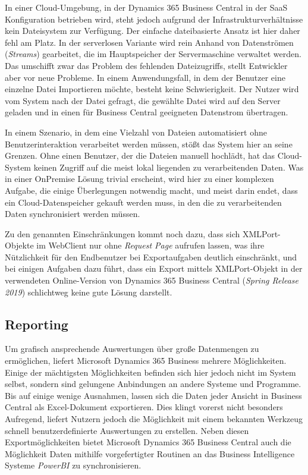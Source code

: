 In einer Cloud-Umgebung, in der Dynamics 365 Business Central in der SaaS Konfiguration betrieben wird, steht jedoch aufgrund der Infrastrukturverhältnisse kein Dateisystem zur Verfügung. Der einfache dateibasierte Ansatz ist hier daher fehl am Platz. In der serverlosen Variante wird rein Anhand von Datenströmen (\textit{Streams}) gearbeitet, die im Hauptspeicher der Servermaschine verwaltet werden. 
Das umschifft zwar das Problem des fehlenden Dateizugriffs, stellt Entwickler aber vor neue Probleme. In einem Anwendungsfall, in dem der Benutzer eine einzelne Datei Importieren möchte, besteht keine Schwierigkeit. Der Nutzer wird vom System nach der Datei gefragt, die gewählte Datei wird auf den Server geladen und in einen für Business Central geeigneten Datenstrom übertragen. \linebreak

In einem Szenario, in dem eine Vielzahl von Dateien automatisiert ohne Benutzerinteraktion verarbeitet werden müssen, stößt das System hier an seine Grenzen. Ohne einen Benutzer, der die Dateien manuell hochlädt, hat das Cloud-System keinen Zugriff auf die meist lokal liegenden zu verarbeitenden Daten. Was in einer OnPremise Lösung trivial erscheint, wird hier zu einer komplexen Aufgabe, die einige Überlegungen notwendig macht, und meist darin endet, dass ein Cloud-Datenspeicher gekauft werden muss, in den die zu verarbeitenden Daten synchronisiert werden müssen. \linebreak

Zu den genannten Einschränkungen kommt noch dazu, dass sich XMLPort-Objekte im WebClient nur ohne \textit{Request Page} aufrufen lassen, was ihre Nützlichkeit für den Endbenutzer bei Exportaufgaben deutlich einschränkt, und bei einigen Aufgaben dazu führt, dass ein Export mittels XMLPort-Objekt in der verwendeten Online-Version von Dynamics 365 Business Central (\textit{Spring Release 2019}) schlichtweg keine gute Lösung darstellt.
\pagebreak

\subsection{Reporting}
Um grafisch ansprechende Auswertungen über große Datenmengen zu ermöglichen, liefert Microsoft Dynamics 365 Business mehrere Möglichkeiten. Einige der mächtigsten Möglichkeiten befinden sich hier jedoch nicht im System selbst, sondern sind gelungene Anbindungen an andere Systeme und Programme. Bis auf einige wenige Ausnahmen, lassen sich die Daten jeder Ansicht in Business Central als Excel-Dokument exportieren. Dies klingt vorerst nicht besonders Aufregend, liefert Nutzern jedoch die Möglichkeit mit einem bekannten Werkzeug schnell benutzerdefinierte Auswertungen zu erstellen. Neben diesen Exportmöglichkeiten bietet Microsoft Dynamics 365 Business Central auch die Möglichkeit Daten mithilfe vorgefertigter Routinen an das Business Intelligence Systeme \textit{PowerBI} zu synchronisieren. \linebreak

